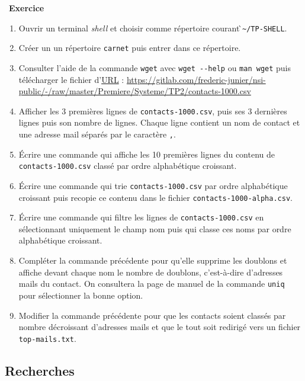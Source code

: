 \documentclass[
  11pt,
]{article}
\newcounter{exo}
\newenvironment{exercice}[1]
{\par \medskip   \addtocounter{exo}{1} \noindent  
\begin{bclogo}[arrondi =0.1,   noborder = true, logo=\bccrayon, marge=4]{~\textbf{Exercice} \textbf{\theexo} {\itshape #1} }  \par}
{
\end{bclogo}
 \par \bigskip }
\newcounter{def}
\begin{document}
\begin{exercice}{}

\begin{enumerate}
\def\labelenumi{\arabic{enumi}.}
\item
  Ouvrir un terminal \emph{shell} et choisir comme répertoire courant
  ̀\texttt{\textasciitilde{}/TP-SHELL}.
\item
  Créer un un répertoire \texttt{carnet} puis entrer dans ce répertoire.
\item
  Consulter l'aide de la commande \texttt{wget} avec
  \texttt{wget\ -\/-help} ou \texttt{man\ wget} puis télécharger le
  fichier
  d'\href{https://fr.wikipedia.org/wiki/Uniform_Resource_Locator}{URL} :
  \url{https://gitlab.com/frederic-junier/nsi-public/-/raw/master/Premiere/Systeme/TP2/contacts-1000.csv}
\item
  Afficher les 3 premières lignes de \texttt{contacts-1000.csv}, puis
  ses 3 dernières lignes puis son nombre de lignes. Chaque ligne
  contient un nom de contact et une adresse mail séparés par le
  caractère \texttt{,}.
\item
  Écrire une commande qui affiche les 10 premières lignes du contenu de
  \texttt{contacts-1000.csv} classé par ordre alphabétique croissant.
\item
  Écrire une commande qui trie \texttt{contacts-1000.csv} par ordre
  alphabétique croissant puis recopie ce contenu dans le fichier
  \texttt{contacts-1000-alpha.csv}.
\item
  Écrire une commande qui filtre les lignes de
  \texttt{contacts-1000.csv} en sélectionnant uniquement le champ nom
  puis qui classe ces noms par ordre alphabétique croissant.
\item
  Compléter la commande précédente pour qu'elle supprime les doublons et
  affiche devant chaque nom le nombre de doublons, c'est-à-dire
  d'adresses mails du contact. On consultera la page de manuel de la
  commande \texttt{uniq} pour sélectionner la bonne option.
\item
  Modifier la commande précédente pour que les contacts soient classés
  par nombre décroissant d'adresses mails et que le tout soit redirigé
  vers un fichier \texttt{top-mails.txt}.
\end{enumerate}

\end{exercice}

\hypertarget{recherches}{%
\subsection{Recherches}\label{recherches}}
\end{document}
